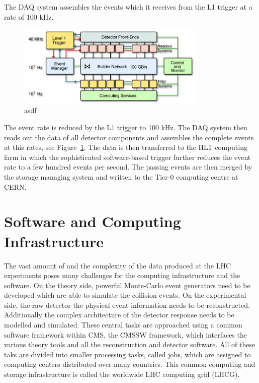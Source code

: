 The DAQ system assembles the events which it receives from the L1 trigger at a
rate of 100 kHz.

\begin{figure}[htp]
    \centering
    \includegraphics[width=0.8\textwidth]{figures/cms_detector/cms_daq.pdf}\hfill
    \caption[The DAQ System of CMS]{asdf}
    \label{fig:cms:daq_system}
\end{figure}

The event rate is reduced by the L1 trigger to 100 kHz. The DAQ system then
reads out the data of all detector components and assembles the complete events
at this rates, see Figure~\ref{fig:cms:daq_system}. The data is then transferred
to the HLT computing farm in which the sophisticated software-based trigger further
reduces the event rate to a few hundred events per second. The passing events
are then merged by the storage managing system and written to the Tier-0
computing centre at CERN.

\section{Software and Computing Infrastructure}

The vast amount of and the complexity of the data produced at the LHC
experiments poses many challenges for the computing infrastructure and the
software. On the theory side, powerful Monte-Carlo event generators need to be
developed which are able to simulate the collision events. On the experimental
side, the raw detector the physical event information needs to be reconstructed. Additionally the
complex architecture of the detector response needs to be modelled and
simulated. These central tasks are approached using a common software framework
within CMS, the CMSSW framework, which interfaces the various theory tools and
all the reconstruction and detector software. All of these taks are divided
into smaller processing tasks, called jobs, which are assigned to computing
centers distributed over many countries. This common computing and storage
infrastructure is called the worldwide LHC computing grid (LHCG).

